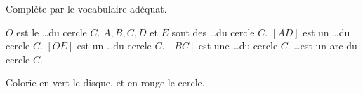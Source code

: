 %
%
Complète par le vocabulaire adéquat.
  \begin{tasks}
    \task $O$ est le \dots du cercle $C$.
    \task $A, B, C, D$ et $E$ sont des \dots du cercle $C$.
    \task $[AD]$ est un \dots du cercle $C$.
    \task $[OE]$ est un \dots du cercle $C$.
    \task $ [BC]$ est une \dots du cercle $C$.
    \task \dots est un arc du cercle $C$.
  \end{tasks}

  Colorie en vert le disque, et en rouge le cercle.
